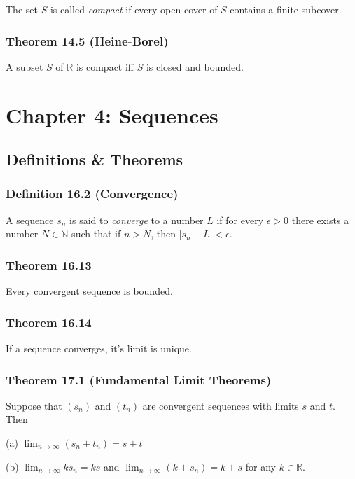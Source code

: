 \documentclass{book}
\begin{document}
The set $S$ is called \emph{compact} if every open cover of $S$ contains a finite subcover. 

\subsection*{Theorem 14.5 (Heine-Borel)}

A subset $S$ of $\mathbb{R}$ is compact iff $S$ is closed and bounded. 

\chapter*{Chapter 4: Sequences}

\section*{Definitions \& Theorems}

\subsection*{Definition 16.2 (Convergence)}

A sequence $s_n$ is said to \emph{converge} to a number $L$ if for every $\epsilon > 0$ there exists a number $N \in  \mathbb{N}$ such that if $n > N$, then $\left|s_n - L\right| < \epsilon$. 

\subsection*{Theorem 16.13}

Every convergent sequence is bounded. 

\subsection*{Theorem 16.14}

If a sequence converges, it's limit is unique. 

\subsection*{Theorem 17.1 (Fundamental Limit Theorems)}

Suppose that $(s_n)$ and $(t_n)$ are convergent sequences with limits $s$ and $t$. Then

(a) $\lim_{n \rightarrow \infty} (s_n + t_n) = s + t$

(b) $\lim_{n \rightarrow \infty} ks_n = ks$ and $\lim_{n \rightarrow \infty} (k + s_n) = k + s$ for any $k \in \mathbb{R}$. 
\end{document}
